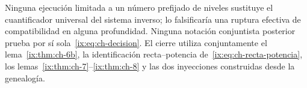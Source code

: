 Ninguna ejecución limitada a un número prefijado de niveles sustituye el
cuantificador universal del sistema inverso; lo falsificaría una ruptura
efectiva de compatibilidad en alguna profundidad. Ninguna notación conjuntista
posterior prueba por sí sola~\eqref{ix:eq:ch-decision}. El cierre utiliza conjuntamente el
lema~\ref{ix:thm:ch-6b}, la identificación recta--potencia de~\eqref{ix:eq:ch-recta-potencia}, los
lemas~\ref{ix:thm:ch-7}--\ref{ix:thm:ch-8} y las dos inyecciones construidas desde
la genealogía.

